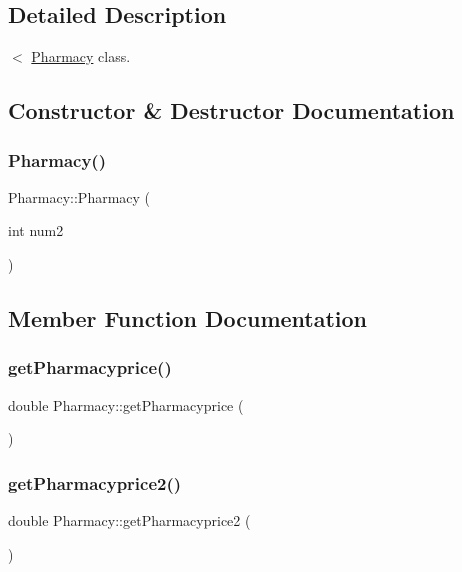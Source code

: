 \subsection{Detailed Description}
$<$ \mbox{\hyperlink{class_pharmacy}{Pharmacy}} class. 

\subsection{Constructor \& Destructor Documentation}
\mbox{\label{class_pharmacy_a9ba64f91ceff049fec74559a173eb74f}} 
\subsubsection{\texorpdfstring{Pharmacy()}{Pharmacy()}}
{\footnotesize\ttfamily Pharmacy\+::\+Pharmacy (\begin{DoxyParamCaption}\item[{int}]{num2 }\end{DoxyParamCaption})\hspace{0.3cm}{\ttfamily [inline]}}



\subsection{Member Function Documentation}
\mbox{\label{class_pharmacy_aa3a5b0a8d99260622d085860a149498f}} 
\subsubsection{\texorpdfstring{getPharmacyprice()}{getPharmacyprice()}}
{\footnotesize\ttfamily double Pharmacy\+::get\+Pharmacyprice (\begin{DoxyParamCaption}{ }\end{DoxyParamCaption})\hspace{0.3cm}{\ttfamily [inline]}}

\mbox{\label{class_pharmacy_a1406c378a278f08eb7525ee96c7326b4}} 
\subsubsection{\texorpdfstring{getPharmacyprice2()}{getPharmacyprice2()}}
{\footnotesize\ttfamily double Pharmacy\+::get\+Pharmacyprice2 (\begin{DoxyParamCaption}{ }\end{DoxyParamCaption})\hspace{0.3cm}{\ttfamily [inline]}}

